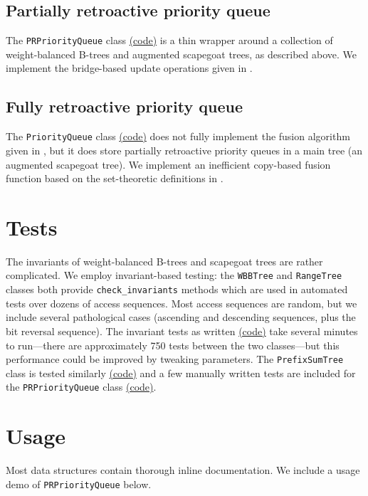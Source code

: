 \documentclass{article}
\begin{document}
\subsection{Partially retroactive priority queue}
The \texttt{PRPriorityQueue} class \href{https://github.com/6851-2021/retroactive-pq/blob/main/retroactive_pq/partial_pq.py}{(code)} is a thin wrapper around a collection of weight-balanced B-trees and augmented scapegoat trees, as described above. We implement the bridge-based update operations given in \cite{demaine2007retroactive}.

\subsection{Fully retroactive priority queue}
The \texttt{PriorityQueue} class \href{https://github.com/6851-2021/retroactive-pq/blob/main/retroactive_pq/full_pq.py}{(code)} does not fully implement the fusion algorithm given in \cite{demaine2015polylogarithmic}, but it does store partially retroactive priority queues in a main tree (an augmented scapegoat tree). We implement an inefficient copy-based fusion function based on the set-theoretic definitions in \cite{demaine2015polylogarithmic}.

\section{Tests}
The invariants of weight-balanced B-trees and scapegoat trees are rather complicated. We employ invariant-based testing: the \texttt{WBBTree} and \texttt{RangeTree} classes both provide \texttt{check\_invariants} methods which are used in automated tests over dozens of access sequences. Most access sequences are random, but we include several pathological cases (ascending and descending sequences, plus the bit reversal sequence). The invariant tests as written \href{https://github.com/6851-2021/retroactive-pq/blob/main/tests/test_tree_invariants.py}{(code)} take several minutes to run---there are approximately 750 tests between the two classes---but this performance could be improved by tweaking parameters. The \texttt{PrefixSumTree} class is tested similarly \href{https://github.com/6851-2021/retroactive-pq/blob/main/tests/test_prefix_sum.py}{(code)} and a few manually written tests are included for the \texttt{PRPriorityQueue} class \href{https://github.com/6851-2021/retroactive-pq/blob/main/tests/test_partial_pq.py}{(code)}.

\section{Usage}
Most data structures contain thorough inline documentation. We include a usage demo of \texttt{PRPriorityQueue} below.
\end{document}
